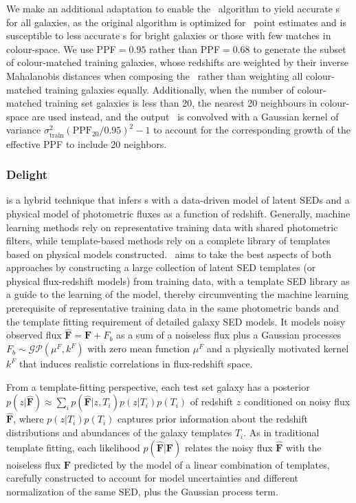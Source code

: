 We make an additional adaptation to enable the \cmnn\ algorithm to yield accurate \pzpdf s for all galaxies, as the original \citet{Graham:17} algorithm is optimized for \pz\ point estimates and is susceptible to less accurate \pzpdf s for bright galaxies or those with few matches in colour-space.
We use PPF$=0.95$ rather than PPF$=0.68$ to generate the subset of colour-matched training galaxies, whose redshifts are weighted by their inverse Mahalanobis distances when composing the \pzpdf\ rather than weighting all colour-matched training galaxies equally.
Additionally, when the number of colour-matched training set galaxies is less than 20, the nearest 20 neighbours in colour-space are used instead, and the output \pzpdf\ is convolved with a Gaussian kernel of variance $\sigma_{\mathrm{ train}}^{2}(\mathrm{PPF}_{20}/0.95)^2 -1$ to account for the corresponding growth of the effective PPF to include 20 neighbors.

\subsubsection{Delight}
\label{sec:delight}

\delight \citep{Leistedt:17} is a hybrid technique that infers \pz s with a data-driven model of latent SEDs and a physical model of photometric fluxes as a function of redshift.
Generally, machine learning methods rely on representative training data with shared photometric filters, while template-based methods rely on a complete library of templates based on physical models constructed.
\delight\ aims to take the best aspects of both approaches by constructing a large collection of latent SED templates (or physical flux-redshift models) from training data, with a template SED library as a guide to the learning of the model, thereby circumventing the machine learning prerequisite of representative training data in the same photometric bands and the template fitting requirement of detailed galaxy SED models.
It models noisy observed flux $\mathbf{\hat{F}} = \mathbf{F} + F_{b}$ as a sum of a noiseless flux plus a Gaussian processes $F_b \sim \mathcal{GP}\left(\mu^F, k^F \right)$ with zero mean function $\mu^{F}$ and a physically motivated kernel $k^{F}$ that induces realistic correlations in flux-redshift space.

From a template-fitting perspective, each test set galaxy has a posterior $p(z \vert \mathbf{\hat{F}}) \approx \sum_i p(\mathbf{\hat{F}} \vert z, T_i) p(z \vert T_i) p(T_i)$ of redshift $z$ conditioned on noisy flux $\mathbf{\hat{F}}$, where $p(z \vert T_i) p(T_i)$ captures prior information about the redshift distributions and abundances of the galaxy templates $T_i$.
As in traditional template fitting, each likelihood $p(\mathbf{\hat{F}} \vert \mathbf{F})$ relates the noisy flux $\mathbf{\hat{F}}$ with the noiseless flux $\mathbf{F}$ predicted by the model of a linear combination of templates, carefully constructed to account for model uncertainties and different normalization of the same SED, plus the Gaussian process term.

